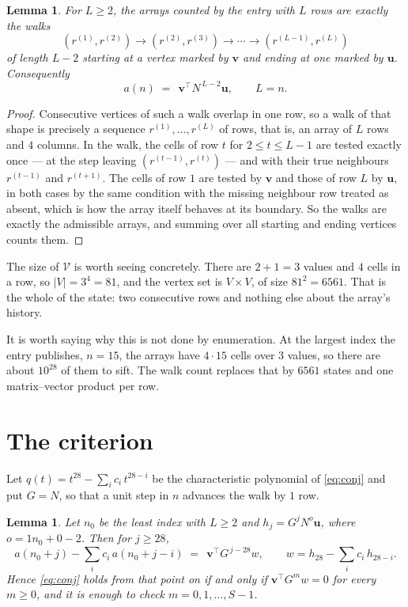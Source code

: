 \documentclass[11pt,a4paper]{article}
\theoremstyle{plain}
\newtheorem{lemma}[theorem]{Lemma}
\theoremstyle{definition}
\begin{document}
\begin{lemma}\label{lem:walk}
For $L\ge2$, the arrays counted by the entry with $L$ rows are exactly the walks
\[
(r^{(1)},r^{(2)})\to(r^{(2)},r^{(3)})\to\cdots\to(r^{(L-1)},r^{(L)})
\]
of length $L-2$ starting at a vertex marked by $\mathbf{v}$ and ending at one marked by
$\mathbf{u}$. Consequently
\[
a(n)\;=\;\,\mathbf{v}^{\!\top}N^{\,L-2}\mathbf{u},\qquad L=n .
\]
\end{lemma}

\begin{proof}
Consecutive vertices of such a walk overlap in one row, so a walk of that shape is
precisely a sequence $r^{(1)},\dots,r^{(L)}$ of rows, that is, an array of $L$ rows
and $4$ columns. In the walk, the cells of row $t$ for $2\le t\le L-1$ are tested
exactly once --- at the step leaving $(r^{(t-1)},r^{(t)})$ --- and with their true
neighbours $r^{(t-1)}$ and $r^{(t+1)}$. The cells of row $1$ are tested by
$\mathbf{v}$ and those of row $L$ by $\mathbf{u}$, in both cases by the same condition
with the missing neighbour row treated as absent, which is how the array itself behaves at
its boundary. So the walks are exactly the admissible arrays, and summing over all starting
and ending vertices counts them.
\end{proof}


The size of $\mathcal V$ is worth seeing concretely. There are $2+1=3$ values
and $4$ cells in a row, so $|V|=3^{4}=81$, and the vertex set is
$V\times V$, of size $81^2=6561$. That is the whole of the state: two consecutive
rows and nothing else about the array's history.

It is worth saying why this is not done by enumeration. At the largest index the entry
publishes, $n=15$, the arrays have $4\cdot15$ cells over
$3$ values, so there are about $10^{28}$ of them to sift. The
walk count replaces that by $6561$ states and one matrix--vector product per row.
\section{The criterion}

Let $q(t)=t^{28}-\sum_i c_i\,t^{28-i}$ be the characteristic polynomial of
\eqref{eq:conj} and put $G=N$, so that a unit step in $n$ advances the walk by
$1$ row.

\begin{lemma}\label{lem:crit}
Let $n_0$ be the least index with $L\ge2$ and $h_j=G^{j}N^{o}\mathbf{u}$, where
$o=1n_0+0-2$. Then for $j\ge28$,
\[
a(n_0+j)-\sum_i c_i\,a(n_0+j-i)\;=\;\,\mathbf{v}^{\!\top}G^{\,j-28}w,
\qquad w=h_{28}-\sum_i c_i\,h_{28-i} .
\]
Hence \eqref{eq:conj} holds from that point on if and only if
$\mathbf{v}^{\!\top}G^{m}w=0$ for every $m\ge0$, and it is enough to check
$m=0,1,\dots,S-1$.
\end{lemma}
\end{document}
